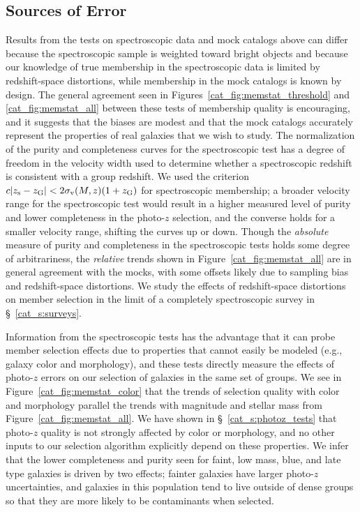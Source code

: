 \subsection{Sources of Error}
\label{cat_s:error}

Results from the tests on spectroscopic data and mock catalogs above
can differ because the spectroscopic sample is weighted toward bright
objects and because our knowledge of true membership in the
spectroscopic data is limited by redshift-space distortions, while
membership in the mock catalogs is known by design. 
The general agreement seen in Figures~\ref{cat_fig:memstat_threshold} and
\ref{cat_fig:memstat_all} between these tests of membership quality is
encouraging, and it suggests that the biases are modest and that the mock
catalogs accurately represent the properties of real galaxies that we
wish to study. The normalization of the purity and completeness curves for the
spectroscopic test has a degree of freedom in the velocity
width used to determine whether a spectroscopic redshift is consistent
with a group redshift. We used the criterion $c|\mbox{$z_{\rm s}$}-\mbox{$z_{\rm G}$}| < 2\sigma_{\rm
  v}(M,z)(1+\mbox{$z_{\rm G}$})$ for spectroscopic membership; a broader velocity
range for the spectroscopic test would result in a higher measured
level of purity and lower completeness in the photo-$z$ selection, and
the converse holds for a smaller velocity range, shifting the curves
up or down. Though the \textit{absolute} measure of purity and
completeness in the spectroscopic tests holds some degree of
arbitrariness, the \textit{relative} trends shown in
Figure~\ref{cat_fig:memstat_all} are in general agreement with the mocks,
with some offsets likely due to sampling bias and redshift-space
distortions. We study the effects of redshift-space distortions on
member selection in the limit of a completely spectroscopic survey in
\S~\ref{cat_s:surveys}.

Information from the spectroscopic tests has the advantage that it
can probe member selection effects due to properties that cannot easily be
modeled (e.g., galaxy color and morphology), and these tests directly
measure the effects of 
photo-$z$ errors on our selection of galaxies in the same set of
groups. We see in Figure~\ref{cat_fig:memstat_color} that the trends of
selection quality with color and morphology parallel the trends with
magnitude and stellar mass from Figure~\ref{cat_fig:memstat_all}. 
We have shown in \S~\ref{cat_s:photoz_tests} that photo-$z$ quality is
not strongly affected by color or morphology, and no other inputs
to our selection algorithm explicitly depend on these properties. We infer
that the lower completeness and purity seen for faint, low mass, blue, and
late type galaxies is driven by two effects; fainter galaxies have
larger photo-$z$ uncertainties, and galaxies in this population tend to live
outside of dense groups so that they are more likely to be
contaminants when selected.

